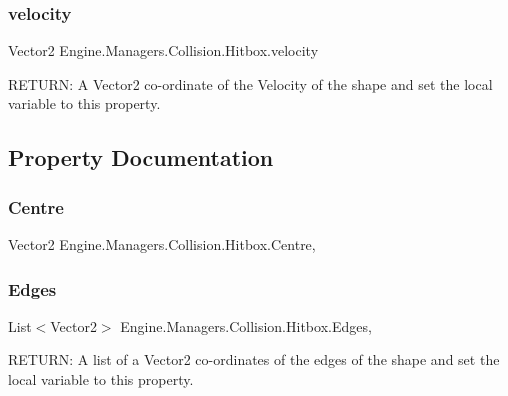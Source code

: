 \subsubsection{\texorpdfstring{velocity}{velocity}}
{\footnotesize\ttfamily Vector2 Engine.\+Managers.\+Collision.\+Hitbox.\+velocity\hspace{0.3cm}{\ttfamily [protected]}}



R\+E\+T\+U\+RN\+: A Vector2 co-\/ordinate of the Velocity of the shape and set the local variable to this property. 



\subsection{Property Documentation}
\mbox{\label{a00506_aea24a643fe9a06c65064bf091427c2fc}} 
\subsubsection{\texorpdfstring{Centre}{Centre}}
{\footnotesize\ttfamily Vector2 Engine.\+Managers.\+Collision.\+Hitbox.\+Centre\hspace{0.3cm}{\ttfamily [get]}, {\ttfamily [set]}}

\mbox{\label{a00506_a32ea07f46a9cd6213e965f837758e674}} 
\subsubsection{\texorpdfstring{Edges}{Edges}}
{\footnotesize\ttfamily List$<$Vector2$>$ Engine.\+Managers.\+Collision.\+Hitbox.\+Edges\hspace{0.3cm}{\ttfamily [get]}, {\ttfamily [set]}}



R\+E\+T\+U\+RN\+: A list of a Vector2 co-\/ordinates of the edges of the shape and set the local variable to this property. 

